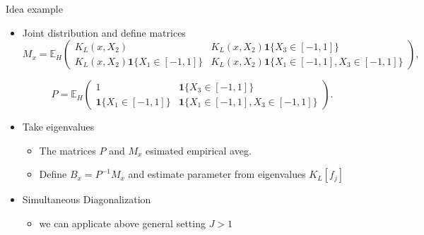 \documentclass[10pt, aspectratio=169]{beamer}
\begin{document}
\begin{frame}{Idea example}
    \begin{itemize}[label=\scalebox{0.5}{$\bullet$}]
        \item Joint distribution and define matrices
        \[
        M_x = \mathbb{E}_H
        \begin{pmatrix}
        K_L(x, X_2) & K_L(x, X_2) \mathbf{1}\{X_3 \in [-1, 1]\} \\
        K_L(x, X_2) \mathbf{1}\{X_1 \in [-1, 1]\} & K_L(x, X_2) \mathbf{1}\{X_1 \in [-1, 1], X_3 \in [-1, 1]\}
        \end{pmatrix},
        \]

        \[
        P = \mathbb{E}_H
        \begin{pmatrix}
        1 & \mathbf{1}\{X_3 \in [-1, 1]\} \\
        \mathbf{1}\{X_1 \in [-1, 1]\} & \mathbf{1}\{X_1 \in [-1, 1], X_3 \in [-1, 1]\}
        \end{pmatrix}.
        \]
        
        \item Take eigenvalues \\
        \begin{itemize}[label=\scalebox{0.5}{$\bullet$}]
            \item The matrices \( P \) and \( M_x \) esimated empirical aveg.
            \item Define \( B_x = P^{-1} M_x \) and estimate parameter from eigenvalues \(K_L[f_j]\)
        \end{itemize}
        \item Simultaneous Diagonalization \\
        \begin{itemize}[label=\scalebox{0.5}{$\bullet$}]
            \item we can applicate above general setting $J > 1$
        \end{itemize}
    \end{itemize}
\end{frame}
\end{document}
